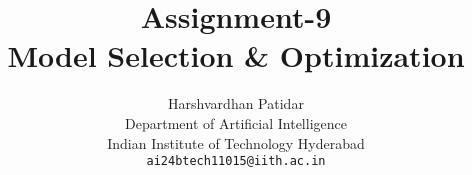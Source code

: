 \documentclass{article}
\title{Assignment-9\\Model Selection \& Optimization}
\author{Harshvardhan Patidar\\
  Department of Artificial Intelligence\\
  Indian Institute of Technology Hyderabad\\
  \texttt{ai24btech11015@iith.ac.in}
}
\begin{document}
\



\maketitle






















\end{document}
